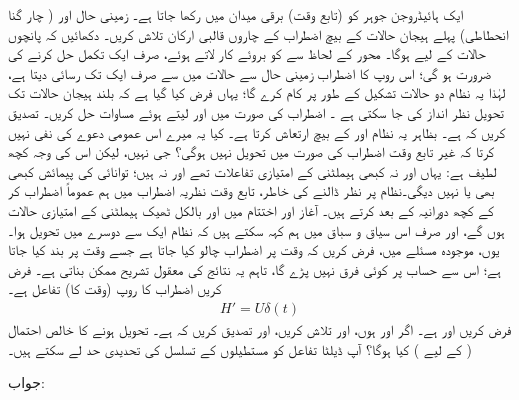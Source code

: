 ایک ہائیڈروجن جوہر کو   (تابع وقت) برقی میدان  میں رکھا جاتا ہے۔ زمینی حال  اور ( چار گنا انحطاطی) پہلے  ہیجان حالات  کے بیچ اضطراب  کے چاروں قالبی ارکان  تلاش کریں۔ دکھائیں کہ پانچوں حالات کے لیے  ہوگا۔   محور  کے لحاظ سے    کو بروئے کار لاتے ہوئے،   صرف ایک تکمل حل کرنے کی ضرورت ہو گی؛  اس روپ کا اضطراب   زمینی حال سے  حالات میں سے صرف ایک تک رسائی دیتا ہے،  لہٰذا  یہ نظام دو حالات تشکیل  کے طور پر کام کرے گا؛ یہاں فرض کیا گیا ہے کہ  بلند ہیجان حالات  تک تحویل  نظر انداز کی  جا سکتی ہے ۔
 اضطراب کی صورت میں  اور  لیتے ہوئے مساوات  حل کریں۔ تصدیق کریں  کہ  ہے۔   بظاہر   یہ نظام    اور   کے بیچ ارتعاش کرتا ہے۔ کیا یہ میرے اس عمومی دعوے کی نفی نہیں کرتا کہ غیر تابع وقت اضطراب کی صورت میں  تحویل  نہیں ہوگی؟ جی نہیں،  لیکن اس کی وجہ    کچھ لطیف ہے: یہاں  اور  نہ کبھی ہیملٹنی کے امتیازی تفاعلات تھے اور نہ ہیں؛  توانائی کی پیمائش کبھی بھی  یا  نہیں دیگی۔نظام پر نظر ڈالنے کی خاطر،   تابع وقت نظریہ اضطراب میں ہم  عموماً    اضطراب   کر کے کچھ  دورانیہ کے  بعد           کرتے ہیں۔ آغاز اور اختتام میں  اور  بالکل ٹھیک ہیملٹنی کے امتیازی حالات ہوں گے،  اور صرف اس  سیاق و سباق میں ہم کہہ سکتے ہیں کہ  نظام ایک سے دوسرے میں  تحویل  ہوا۔ یوں، موجودہ مسئلے میں، فرض کریں  کہ وقت  پر اضطراب چالو کیا جاتا ہے جسے وقت  پر بند  کیا جاتا ہے؛ اس سے حساب پر کوئی فرق نہیں پڑے گا،  تاہم یہ  نتائج کی معقول تشریح ممکن بناتی ہے۔
فرض کریں اضطراب کا روپ  (وقت کا)   تفاعل ہے۔
\begin{align*}
	H'=U\delta(t) 
\end{align*}
فرض کریں    اور  ہے۔ اگر  اور  ہوں،    اور  تلاش کریں،  اور  تصدیق کریں کہ   ہے۔ تحویل ہونے   کا خالص  احتمال (  کے لیے )  کیا ہوگا؟   آپ ڈیلٹا تفاعل کو مستطیلوں کے تسلسل کی تحدیدی حد لے سکتے ہیں۔

جواب:  


